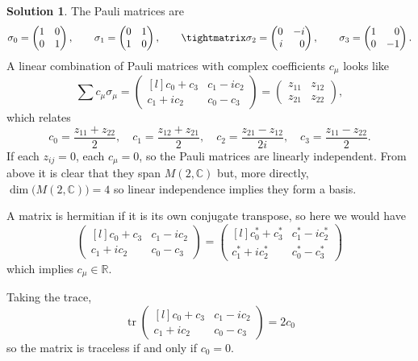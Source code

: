 \documentclass[11pt, a4paper]{report}
\theoremstyle{definition}
\newtheorem{solution}{Solution}[part]
\newenvironment{sol}{\begin{solution}}{\end{solution}\pagebreak[3]}
\DeclareMathOperator{\tr}{tr}
\begin{document}
\begin{sol}

The Pauli matrices are
\[
    \sigma_0 = \begin{pmatrix}
            1 & 0 \\
            0 & 1
        \end{pmatrix}, \qquad
    \sigma_1 = \begin{pmatrix}
            0 & 1 \\
            1 & 0
        \end{pmatrix}, \qquad
    \tightmatrix
    \sigma_2 = \begin{pmatrix*}[r]
            0 & -i \\
            i &  0
        \end{pmatrix*}, \qquad
    \sigma_3 = \begin{pmatrix*}[r]
            1 &  0 \\
            0 & -1
        \end{pmatrix*}.
\]
A linear combination of Pauli matrices with complex coefficients $c_\mu$ looks like
\[
    \sum c_\mu \sigma_\mu =
        \begin{pmatrix*}[l]
            c_0 + c_3  & c_1 - ic_2 \\
            c_1 + ic_2 & c_0 - c_3
        \end{pmatrix*}
    = \begin{pmatrix}
        z_{11} & z_{12} \\
        z_{21} & z_{22}
    \end{pmatrix},
\]
which relates
\[
    c_0 = \frac{z_{11} + z_{22}}{2}, \quad
    c_1 = \frac{z_{12} + z_{21}}{2}, \quad
    c_2 = \frac{z_{21} - z_{12}}{2i}, \quad
    c_3 = \frac{z_{11} - z_{22}}{2}.
\]
If each $z_{ij} = 0$, each $c_\mu = 0$, so the Pauli matrices are linearly independent.
From above it is clear that they span $M(2, \mathbb{C})$ but, more directly, $\dim \bigl( M(2, \mathbb{C}) \bigr) = 4$ so linear independence implies they form a basis.

A matrix is hermitian if it is its own conjugate transpose, so here we would have
\[
        \begin{pmatrix*}[l]
            c_0 + c_3  & c_1 - ic_2 \\
            c_1 + ic_2 & c_0 - c_3
        \end{pmatrix*}
        =
        \begin{pmatrix*}[l]
            c_0^* + c_3^*  & c_1^* - ic_2^* \\
            c_1^* + ic_2^* & c_0^* - c_3^*
        \end{pmatrix*}
\]
which implies $c_\mu \in \mathbb{R}$.

Taking the trace,
\[
    \tr \begin{pmatrix*}[l]
                c_0 + c_3  & c_1 - ic_2 \\
                c_1 + ic_2 & c_0 - c_3
              \end{pmatrix*}
        = 2 c_0
\]
so the matrix is traceless if and only if $c_0 = 0$.

\end{sol}
\end{document}
